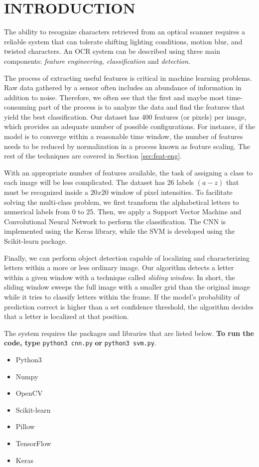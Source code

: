 \section{INTRODUCTION}


The ability to recognize characters retrieved from an optical scanner requires a reliable system that can tolerate shifting lighting conditions, motion blur, and twisted characters. An OCR system can be described using three main components: \textit{feature engineering, classification} and \textit{detection}.

The process of extracting useful features is critical in machine learning problems. Raw data gathered by a sensor often includes an abundance of information in addition to noise. Therefore, we often see that the first and maybe most time-consuming part of the process is to analyze the data and find the features that yield the best classification. Our dataset has 400 features (or pixels) per image, which provides an adequate number of possible configurations. For instance, if the model is to converge within a reasonable time window, the number of features needs to be reduced by normalization in a process known as feature scaling. The rest of the techniques are covered in Section \ref{sec:feat-eng}.

With an appropriate number of features available, the task of assigning a class to each image will be less complicated. The dataset has 26 labels $(a-z)$ that must be recognized inside a $20x20$ window of pixel intensities. To facilitate solving the multi-class problem, we first transform the alphabetical letters to numerical labels from 0 to 25. Then, we apply a Support Vector Machine and Convolutional Neural Network to perform the classification. The CNN is implemented using the Keras library, while the SVM is developed using the Scikit-learn package.

Finally, we can perform object detection capable of localizing and characterizing letters within a more or less ordinary image. Our algorithm detects a letter within a given window with a technique called \textit{sliding window}. In short, the sliding window sweeps the full image with a smaller grid than the original image while it tries to classify letters within the frame. If the model's probability of prediction correct is higher than a set confidence threshold, the algorithm decides that a letter is localized at that position. 

The system requires the packages and libraries that are listed below. \textbf{To run the code, type} \verb|python3 cnn.py| \textbf{or} \verb|python3 svm.py|.

\begin{itemize}
    \item Python3
    \item Numpy
    \item OpenCV
    \item Scikit-learn
    \item Pillow
    \item TensorFlow
    \item Keras
\end{itemize}
